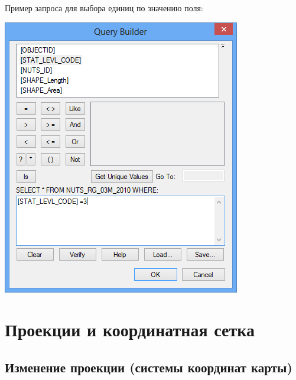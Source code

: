 \documentclass[]{book}
\theoremstyle{definition}
\theoremstyle{definition}
\theoremstyle{definition}
\theoremstyle{remark}
\begin{document}
Пример запроса для выбора единиц по значению поля:

\includegraphics{images/Appendix/image73.png}

\hypertarget{manual-projections}{%
\chapter{Проекции и координатная сетка}\label{manual-projections}}

\hypertarget{manual-projections-change}{%
\section{Изменение проекции (системы координат
карты)}\label{manual-projections-change}}
\end{document}
